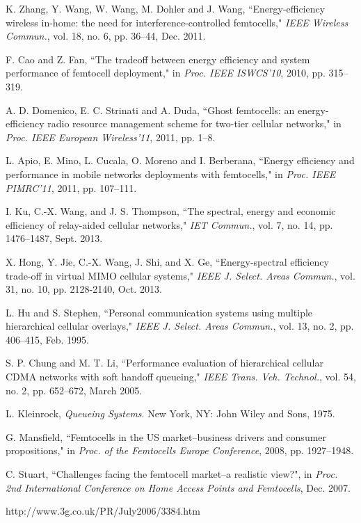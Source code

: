 \documentclass[10pt,final,journal,letterpaper,twoside,twocolumn]{IEEEtran}
\begin{document}
\begin{thebibliography}{1}
    K. Zhang, Y. Wang, W. Wang, M. Dohler and J. Wang, ``Energy-efficiency wireless in-home: the need for interference-controlled femtocells," {\em IEEE Wireless Commun.}, vol. 18, no. 6, pp. 36--44, Dec. 2011.

    F. Cao and Z. Fan, ``The tradeoff between energy efficiency and system performance of femtocell deployment," in {\em Proc. IEEE ISWCS'10}, 2010, pp. 315--319.

    A. D. Domenico, E. C. Strinati and A. Duda, ``Ghost femtocells: an energy-efficiency radio resource management scheme for two-tier cellular networks," in {\em Proc. IEEE European Wireless'11}, 2011, pp. 1--8.

L. Apio, E. Mino, L. Cucala, O. Moreno and I. Berberana, ``Energy efficiency
and performance in mobile networks deployments with femtocells," in {\em
Proc. IEEE PIMRC'11}, 2011, pp. 107--111.

I. Ku, C.-X. Wang, and J. S. Thompson, ``The spectral, energy and economic efficiency of relay-aided cellular networks," {\em IET Commun.}, vol. 7, no. 14, pp. 1476--1487, Sept. 2013.

X. Hong, Y. Jie, C.-X. Wang, J. Shi, and X. Ge, ``Energy-spectral efficiency trade-off in virtual MIMO cellular systems," {\em IEEE J. Select. Areas Commun.}, vol. 31, no. 10, pp. 2128-2140, Oct. 2013.

L. Hu and S. Stephen, ``Personal communication systems using multiple hierarchical cellular overlays," {\em IEEE J. Select. Areas Commun.}, vol. 13, no. 2, pp. 406--415, Feb. 1995.

S. P. Chung and M. T. Li, ``Performance evaluation of hierarchical cellular CDMA networks with soft handoff queueing," {\em IEEE Trans. Veh. Technol.}, vol. 54, no. 2, pp. 652--672, March 2005.

L. Kleinrock, {\em Queueing Systems}. New York, NY: John Wiley and Sons,
1975.

G. Mansfield, ``Femtocells in the US market--business drivers and consumer propositions," in {\em Proc. of the Femtocells Europe Conference}, 2008, pp. 1927--1948.

C. Stuart, ``Challenges facing the femtocell market--a
realistic view?", in {\em Proc. 2nd International Conference on Home Access
Points and Femtocells}, Dec. 2007.

    http://www.3g.co.uk/PR/July2006/3384.htm


\end{thebibliography}
\end{document}
